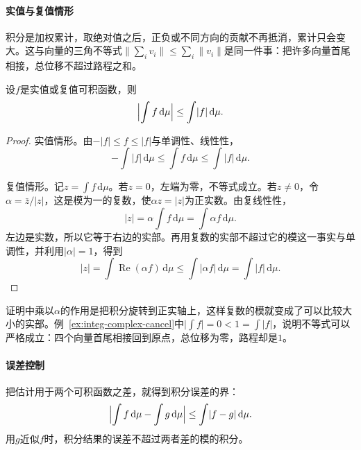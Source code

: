 \paragraph{实值与复值情形}
积分是加权累计，取绝对值之后，正负或不同方向的贡献不再抵消，累计只会变大。这与向量的三角不等式$\lVert\sum_iv_i\rVert\leq\sum_i\lVert v_i\rVert$是同一件事：把许多向量首尾相接，总位移不超过路程之和。

\begin{theorem}[积分的绝对值估计]
\label{thm:integ-absolute-estimate}
设$f$是实值或复值可积函数，则
\begin{equation}
 \Bigl\lvert\int f\,\mathrm d\mu\Bigr\rvert\leq\int\lvert f\rvert\,\mathrm d\mu .
 \label{eq:integ-absolute-estimate}
\end{equation}
\end{theorem}

\begin{proof}
实值情形。由$-\lvert f\rvert\leq f\leq\lvert f\rvert$与单调性、线性性，
\[
 -\int\lvert f\rvert\,\mathrm d\mu\leq\int f\,\mathrm d\mu\leq\int\lvert f\rvert\,\mathrm d\mu .
\]

复值情形。记$z=\int f\,\mathrm d\mu$。若$z=0$，左端为零，不等式成立。若$z\neq0$，令$\alpha=\bar z/\lvert z\rvert$，这是模为一的复数，使$\alpha z=\lvert z\rvert$为正实数。由复线性性，
\[
 \lvert z\rvert=\alpha\int f\,\mathrm d\mu=\int\alpha f\,\mathrm d\mu .
\]
左边是实数，所以它等于右边的实部。再用复数的实部不超过它的模这一事实与单调性，并利用$\lvert\alpha\rvert=1$，得到
\[
 \lvert z\rvert=\int\operatorname{Re}(\alpha f)\,\mathrm d\mu\leq\int\lvert\alpha f\rvert\,\mathrm d\mu=\int\lvert f\rvert\,\mathrm d\mu .
\]
\end{proof}

证明中乘以$\alpha$的作用是把积分旋转到正实轴上，这样复数的模就变成了可以比较大小的实部。例~\ref{ex:integ-complex-cancel}中$\lvert\int f\rvert=0<1=\int\lvert f\rvert$，说明不等式可以严格成立：四个向量首尾相接回到原点，总位移为零，路程却是$1$。

\paragraph{误差控制}
把估计用于两个可积函数之差，就得到积分误差的界：
\begin{equation}
 \Bigl\lvert\int f\,\mathrm d\mu-\int g\,\mathrm d\mu\Bigr\rvert\leq\int\lvert f-g\rvert\,\mathrm d\mu .
 \label{eq:integ-error-bound}
\end{equation}
用$g$近似$f$时，积分结果的误差不超过两者差的模的积分。

